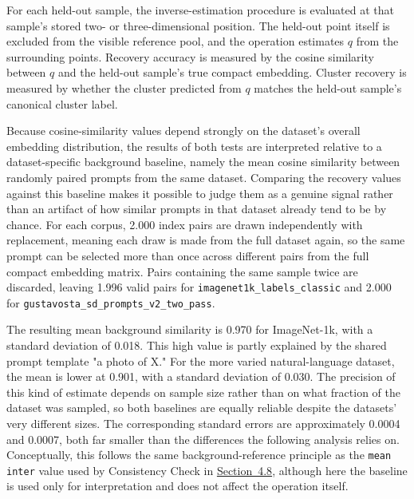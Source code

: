 For each held-out sample, the inverse-estimation procedure is evaluated at that sample's stored two- or three-dimensional position. The held-out point itself is excluded from the visible reference pool, and the operation estimates $q$ from the surrounding points. Recovery accuracy is measured by the cosine similarity between $q$ and the held-out sample's true compact embedding. Cluster recovery is measured by whether the cluster predicted from $q$ matches the held-out sample's canonical cluster label.

Because cosine-similarity values depend strongly on the dataset's overall embedding distribution, the results of both tests are interpreted relative to a dataset-specific background baseline, namely the mean cosine similarity between randomly paired prompts from the same dataset. Comparing the recovery values against this baseline makes it possible to judge them as a genuine signal rather than an artifact of how similar prompts in that dataset already tend to be by chance. For each corpus, 2.000 index pairs are drawn independently with replacement, meaning each draw is made from the full dataset again, so the same prompt can be selected more than once across different pairs from the full compact embedding matrix. Pairs containing the same sample twice are discarded, leaving 1.996 valid pairs for \texttt{imagenet1k\_labels\_classic} and 2.000 for \texttt{gustavosta\_sd\_prompts\_v2\_two\_pass}.

The resulting mean background similarity is 0.970 for ImageNet-1k, with a standard deviation of 0.018. This high value is partly explained by the shared prompt template "a photo of X." For the more varied natural-language dataset, the mean is lower at 0.901, with a standard deviation of 0.030. The precision of this kind of estimate depends on sample size rather than on what fraction of the dataset was sampled, so both baselines are equally reliable despite the datasets' very different sizes. The corresponding standard errors are approximately 0.0004 and 0.0007, both far smaller than the differences the following analysis relies on. Conceptually, this follows the same background-reference principle as the \texttt{mean inter} value used by Consistency Check in \hyperref[sec:4.8]{Section~4.8}, although here the baseline is used only for interpretation and does not affect the operation itself.

